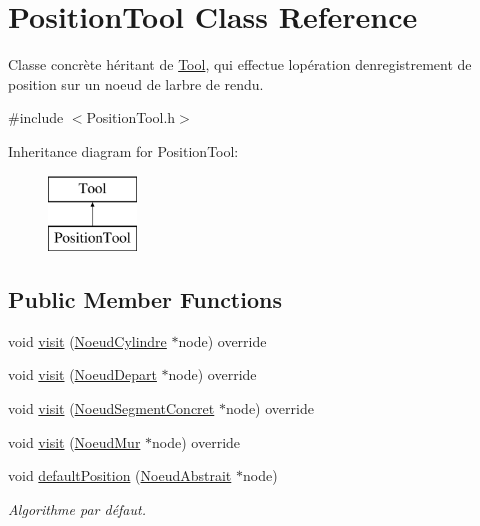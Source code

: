 \hypertarget{class_position_tool}{}\section{Position\+Tool Class Reference}
\label{class_position_tool}


Classe concrète héritant de \hyperlink{class_tool}{Tool}, qui effectue l\textquotesingle{}opération d\textquotesingle{}enregistrement de position sur un noeud de l\textquotesingle{}arbre de rendu.  




{\ttfamily \#include $<$Position\+Tool.\+h$>$}

Inheritance diagram for Position\+Tool\+:\begin{figure}[H]
\begin{center}
\leavevmode
\includegraphics[height=2.000000cm]{class_position_tool}
\end{center}
\end{figure}
\subsection*{Public Member Functions}
\begin{DoxyCompactItemize}
\item 
void \hyperlink{group__inf2990_gac1643483872455c76ef059ac67ae6d04}{visit} (\hyperlink{class_noeud_cylindre}{Noeud\+Cylindre} $\ast$node) override
\item 
void \hyperlink{group__inf2990_ga25f3c9e1decf3bf95d1e7491a2668565}{visit} (\hyperlink{class_noeud_depart}{Noeud\+Depart} $\ast$node) override
\item 
void \hyperlink{group__inf2990_ga48b51161058393ca12df07c9d28197a7}{visit} (\hyperlink{class_noeud_segment_concret}{Noeud\+Segment\+Concret} $\ast$node) override
\item 
void \hyperlink{group__inf2990_gaf80e360d0e162b7075f5272e5860f60f}{visit} (\hyperlink{class_noeud_mur}{Noeud\+Mur} $\ast$node) override
\item 
void \hyperlink{group__inf2990_ga805981677e352dd98b018d04376bb6eb}{default\+Position} (\hyperlink{class_noeud_abstrait}{Noeud\+Abstrait} $\ast$node)
\begin{DoxyCompactList}\small\item\em Algorithme par défaut. \end{DoxyCompactList}\end{DoxyCompactItemize}


